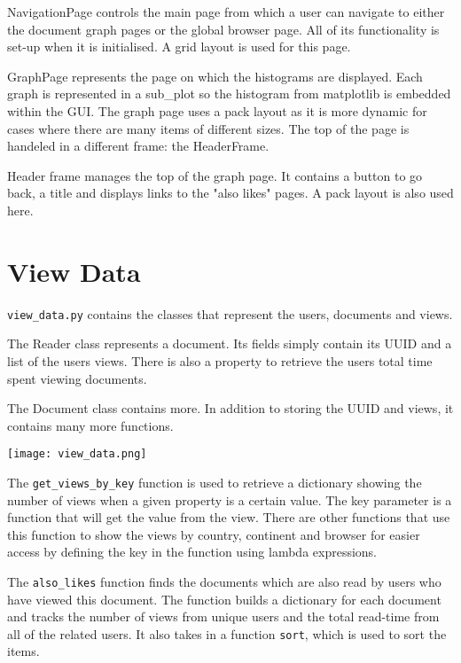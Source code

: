 \documentclass[12pt]{report}
\begin{document}
NavigationPage controls the main page from which a user can navigate to either the document graph pages or the global browser page.  All of its functionality is set-up when it is initialised.  A grid layout is used for this page.

GraphPage represents the page on which the histograms are displayed.  Each graph is represented in a sub\_plot so the histogram from matplotlib is embedded within the GUI.  The graph page uses a pack layout as it is more dynamic for cases where there are many items of different sizes.  The top of the page is handeled in a different frame: the HeaderFrame.

Header frame manages the top of the graph page.  It contains a button to go back, a title and displays links to the "also likes" pages.  A pack layout is also used here.

\section{View Data}\label{viewdata}

\lstinline{view_data.py}\lstinline{} contains the classes that represent the users, documents and views.  

The Reader class represents a document.  Its fields simply contain its UUID and a list of the users views.  There is also a property to retrieve the users total time spent viewing documents.

The Document class contains more.  In addition to storing the UUID and views, it contains many more functions.  

\texttt{[image: view\_data.png]}

The \lstinline{get_views_by_key}\lstinline{}  function is used to retrieve a dictionary showing the number of views when a given property is a certain value.  The key parameter is a function that will get the value from the view.  There are other functions that use this function to show the views by country, continent and browser for easier access by defining the key in the function using lambda expressions.

The \lstinline{also_likes}\lstinline{} function finds the documents which are also read by users who have viewed this document.  The function builds a dictionary for each document and tracks the number of views from unique users and the total read-time from all of the related users.  It also takes in a function \lstinline{sort}\lstinline{}, which is used to sort the items.
\end{document}

